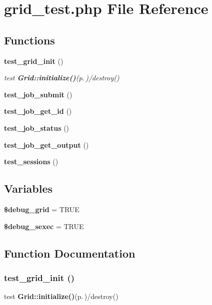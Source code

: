 \section{grid\_\-test.php File Reference}
\label{grid__test_8php}
\subsection*{Functions}
\begin{CompactItemize}
\item 
{\bf test\_\-grid\_\-init} ()
\begin{CompactList}\small\item\em test {\bf Grid::initialize()}{\rm (p.\,\pageref{classGrid_a11})}/destroy() \item\end{CompactList}\item 
{\bf test\_\-job\_\-submit} ()
\item 
{\bf test\_\-job\_\-get\_\-id} ()
\item 
{\bf test\_\-job\_\-status} ()
\item 
{\bf test\_\-job\_\-get\_\-output} ()
\item 
{\bf test\_\-sessions} ()
\end{CompactItemize}
\subsection*{Variables}
\begin{CompactItemize}
\item 
{\bf \$debug\_\-grid} = TRUE
\item 
{\bf \$debug\_\-sexec} = TRUE
\end{CompactItemize}


\subsection{Function Documentation}
\subsubsection{\setlength{\rightskip}{0pt plus 5cm}test\_\-grid\_\-init ()}\label{grid__test_8php_a2}


test {\bf Grid::initialize()}{\rm (p.\,\pageref{classGrid_a11})}/destroy() 

